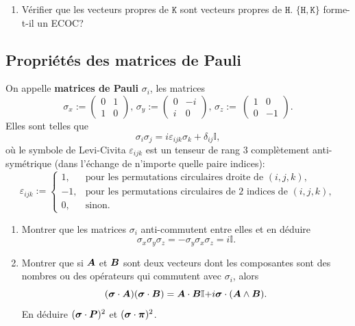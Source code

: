{\begin{enumerate}
\item Vérifier que les vecteurs propres de $\mathtt{K}$ sont vecteurs propres 
de $\mathtt{H}$. $\{\mathtt{H},\mathtt{K}\}$ forme-t-il un ECOC?
\end{enumerate}


\subsection{Propriétés des matrices de Pauli}

On appelle \textbf{matrices de Pauli} $\sigma_{i}$, les matrices
\begin{equation}
\sigma_{x}:=\begin{pmatrix}
0 & 1\\
1 & 0
\end{pmatrix},\,
\sigma_{y}:=
\begin{pmatrix}
0 & -i\\
i & 0
\end{pmatrix},\,
\sigma_{z}:=\
\begin{pmatrix}
1 & 0\\
0 & -1
\end{pmatrix}.
\label{eq:MPauli}%
\end{equation}
Elles sont telles que%
\begin{equation}
\sigma_{i}\sigma_{j}=i\varepsilon_{ijk}\sigma_{k}+\delta_{ij}\mathbb{I},
\end{equation}
où le symbole de Levi-Civita
$\varepsilon_{ijk}$ est un tenseur de rang $3$ complètement anti-symétrique
(dans l'échange de n'importe quelle paire indices):
\begin{equation}
\varepsilon_{ijk}:=\begin{cases}
1, & \text{pour les permutations circulaires droite de }(i,j,k),\\
-1, & \text{pour les permutations circulaires de 2 indices de }(i,j,k),\\
0, & \text{sinon.}
\end{cases}
\end{equation}

\begin{enumerate}
\item Montrer que les matrices $\sigma_{i}$ anti-commutent entre elles et en
déduire
\begin{equation}
\sigma_{x}\sigma_{y}\sigma_{z}=-\sigma_{y}\sigma_{x}\sigma_{z}=i\mathbb{I}.
\end{equation}

\item Montrer que si $\boldsymbol{A}$ et $\boldsymbol{B}$ sont deux vecteurs dont les
composantes sont des nombres ou des opérateurs qui commutent avec $\sigma_{i}$,
alors
\begin{equation}
(\boldsymbol{\sigma}\cdot\boldsymbol{A})(\boldsymbol{\sigma}\cdot\boldsymbol{B})=\boldsymbol{A}\cdot
\boldsymbol{B}\mathbb{I+}i\boldsymbol{\sigma}\cdot(\boldsymbol{A}\wedge\boldsymbol{B}).
\end{equation}
En déduire $(\boldsymbol{\sigma}\cdot\boldsymbol{P})^{2}$ et
$(\boldsymbol{\sigma}\cdot\boldsymbol{\pi})^{2}$.


\end{enumerate}}
